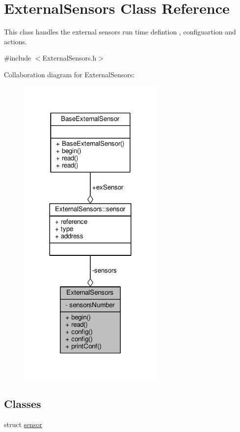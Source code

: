 \hypertarget{class_external_sensors}{}\section{External\+Sensors Class Reference}
\label{class_external_sensors}


This class handles the external sensors run time defintion , configuartion and actions.  




{\ttfamily \#include $<$External\+Sensors.\+h$>$}



Collaboration diagram for External\+Sensors\+:\nopagebreak
\begin{figure}[H]
\begin{center}
\leavevmode
\includegraphics[width=204pt]{d8/df9/class_external_sensors__coll__graph}
\end{center}
\end{figure}
\subsection*{Classes}
\begin{DoxyCompactItemize}
\item 
struct \hyperlink{class_external_sensors_dd/d58/struct_external_sensors_1_1sensor}{sensor}
\end{DoxyCompactItemize}
